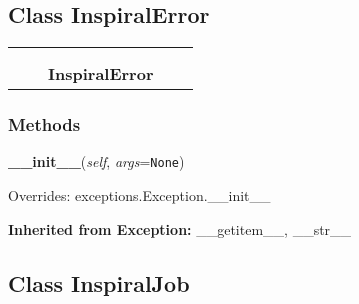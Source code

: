 \subsection{Class InspiralError}

    \label{inspiral:InspiralError}
\begin{tabular}{cccccc}
\multicolumn{2}{r}{\settowidth{\BCL}{exceptions.Exception}\multirow{2}{\BCL}{exceptions.Exception}}
&&
  \\\cline{3-3}
  &&\multicolumn{1}{c|}{}
&&
  \\
&&\multicolumn{2}{l}{\textbf{InspiralError}}
\end{tabular}



  \subsubsection{Methods}

    \label{inspiral:InspiralError:__init__}
    \vspace{0.5ex}

    \noindent\begin{boxedminipage}{\textwidth}

    \raggedright \textbf{\_\_init\_\_}(\textit{self}, \textit{args}=\texttt{N\-o\-n\-e\-})

      Overrides: exceptions.Exception.\_\_init\_\_

    \end{boxedminipage}

  \noindent\textbf{Inherited from Exception:}
    \_\_getitem\_\_,
    \_\_str\_\_


\subsection{Class InspiralJob}

